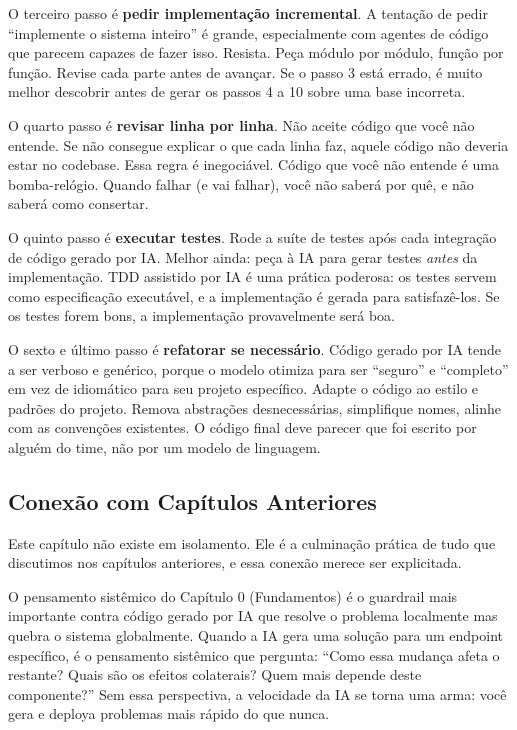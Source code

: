 O terceiro passo é \textbf{pedir implementação incremental}. A tentação de pedir
``implemente o sistema inteiro'' é grande, especialmente com agentes de código que
parecem capazes de fazer isso. Resista. Peça módulo por módulo, função por função.
Revise cada parte antes de avançar. Se o passo 3 está errado, é muito melhor descobrir
antes de gerar os passos 4 a 10 sobre uma base incorreta.

O quarto passo é \textbf{revisar linha por linha}. Não aceite código que você não
entende. Se não consegue explicar o que cada linha faz, aquele código não deveria
estar no codebase. Essa regra é inegociável. Código que você não entende é uma
bomba-relógio. Quando falhar (e vai falhar), você não saberá por quê, e não
saberá como consertar.

O quinto passo é \textbf{executar testes}. Rode a suíte de testes após cada
integração de código gerado por IA. Melhor ainda: peça à IA para gerar testes
\textit{antes} da implementação. TDD assistido por IA é uma prática poderosa: os
testes servem como especificação executável, e a implementação é gerada para
satisfazê-los. Se os testes forem bons, a implementação provavelmente será boa.

O sexto e último passo é \textbf{refatorar se necessário}. Código gerado por IA
tende a ser verboso e genérico, porque o modelo otimiza para ser ``seguro'' e
``completo'' em vez de idiomático para seu projeto específico. Adapte o código ao
estilo e padrões do projeto. Remova abstrações desnecessárias, simplifique nomes,
alinhe com as convenções existentes. O código final deve parecer que foi escrito por
alguém do time, não por um modelo de linguagem.

\subsection{Conexão com Capítulos Anteriores}

Este capítulo não existe em isolamento. Ele é a culminação prática de tudo que
discutimos nos capítulos anteriores, e essa conexão merece ser explicitada.

O pensamento sistêmico do Capítulo 0 (Fundamentos) é o guardrail mais importante
contra código gerado por IA que resolve o problema localmente mas quebra o sistema
globalmente. Quando a IA gera uma solução para um endpoint específico, é o pensamento
sistêmico que pergunta: ``Como essa mudança afeta o restante? Quais são os efeitos
colaterais? Quem mais depende deste componente?'' Sem essa perspectiva, a velocidade
da IA se torna uma arma: você gera e deploya problemas mais rápido do que nunca.

